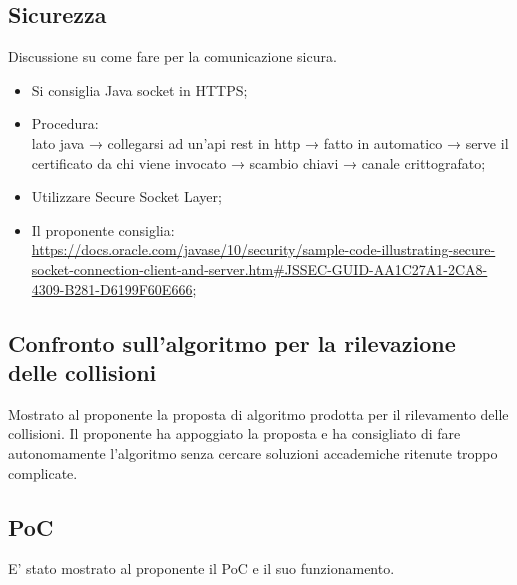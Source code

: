 \subsection{Sicurezza}
Discussione su come fare per la comunicazione sicura.
\begin{itemize}
	\item Si consiglia Java socket in HTTPS;
	\item Procedura:\\
	lato java → collegarsi ad un'api rest in http → fatto in automatico → serve il certificato da chi viene invocato → scambio chiavi → canale crittografato;
	\item Utilizzare Secure Socket Layer;
	\item Il proponente consiglia:\\\href{https://docs.oracle.com/javase/10/security/sample-code-illustrating-secure-socket-connection-client-and-server.htm\#JSSEC-GUID-AA1C27A1-2CA8-4309-B281-D6199F60E666}{https://docs.oracle.com/javase/10/security/sample-code-illustrating-secure-socket-connection-client-and-server.htm\#JSSEC-GUID-AA1C27A1-2CA8-4309-B281-D6199F60E666};	
\end{itemize}

\subsection{Confronto sull'algoritmo per la rilevazione delle collisioni}
Mostrato al proponente la proposta di algoritmo prodotta per il rilevamento delle collisioni. Il proponente ha appoggiato la proposta e ha consigliato di fare autonomamente l'algoritmo senza cercare soluzioni accademiche ritenute troppo complicate.

\subsection{PoC}
E' stato mostrato al proponente il PoC e il suo funzionamento. 